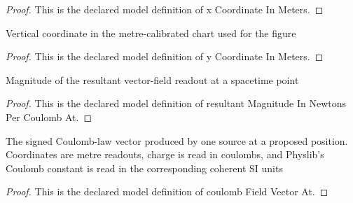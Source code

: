 \begin{proof}
  This is the declared model definition of x Coordinate In Meters.
\end{proof}
\begin{definition}
  \label{def:physics:phyx-mini-0832:phyxminiproblems-problemphyxmini0832-ycoordinateinmeters}
  Vertical coordinate in the metre-calibrated chart used for the figure
\end{definition}
\begin{proof}
  This is the declared model definition of y Coordinate In Meters.
\end{proof}
\begin{definition}
  \label{def:physics:phyx-mini-0832:phyxminiproblems-problemphyxmini0832-resultantmagnitudeinnewtonspercoulombat}
  Magnitude of the resultant vector-field readout at a spacetime point
\end{definition}
\begin{proof}
  This is the declared model definition of resultant Magnitude In Newtons Per Coulomb At.
\end{proof}
\begin{definition}
  \label{def:physics:phyx-mini-0832:phyxminiproblems-problemphyxmini0832-coulombfieldvectorat}
  The signed Coulomb-law vector produced by one source at a proposed position. Coordinates are metre readouts, charge is read in coulombs, and Physlib's Coulomb constant is read in the corresponding coherent SI units
\end{definition}
\begin{proof}
  This is the declared model definition of coulomb Field Vector At.
\end{proof}
